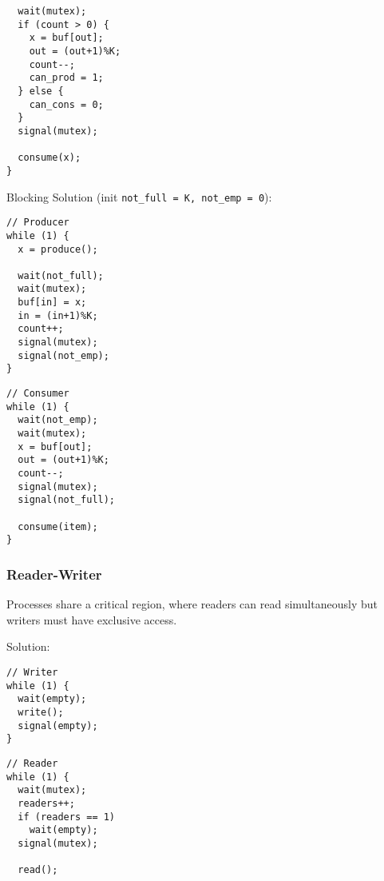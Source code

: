 \documentclass[12pt, a4paper]{article}
\begin{document}
\begin{multicols*}{3}
\begin{minipage}{0.5\columnwidth}
\begin{lstlisting}
  wait(mutex);
  if (count > 0) {
    x = buf[out];
    out = (out+1)%K;
    count--;
    can_prod = 1;
  } else {
    can_cons = 0;
  }
  signal(mutex);

  consume(x);
}

  \end{lstlisting}
\end{minipage}

Blocking Solution (init \lstinline|not_full = K, not_emp = 0|):\\
\begin{minipage}{0.45\columnwidth}
  \begin{lstlisting}
// Producer
while (1) {
  x = produce();

  wait(not_full);
  wait(mutex);
  buf[in] = x;
  in = (in+1)%K;
  count++;
  signal(mutex);
  signal(not_emp);
}
  \end{lstlisting}
\end{minipage}
\begin{minipage}{0.5\columnwidth}
  \begin{lstlisting}
// Consumer
while (1) {
  wait(not_emp);
  wait(mutex);
  x = buf[out];
  out = (out+1)%K;
  count--;
  signal(mutex);
  signal(not_full);

  consume(item);
}
  \end{lstlisting}
\end{minipage}

\colbreak
\subsubsection{Reader-Writer}
Processes share a critical region, where readers can read simultaneously but writers must have exclusive access.

Solution:\\
\begin{minipage}{0.45\columnwidth}
  \begin{lstlisting}
// Writer
while (1) {
  wait(empty);
  write();
  signal(empty);
}
  \end{lstlisting}
\end{minipage}
\begin{minipage}{0.5\columnwidth}
  \begin{lstlisting}
// Reader 
while (1) {
  wait(mutex);
  readers++;
  if (readers == 1)
    wait(empty);
  signal(mutex);

  read();


\end{lstlisting}
\end{minipage}
\end{multicols*}
\end{document}

